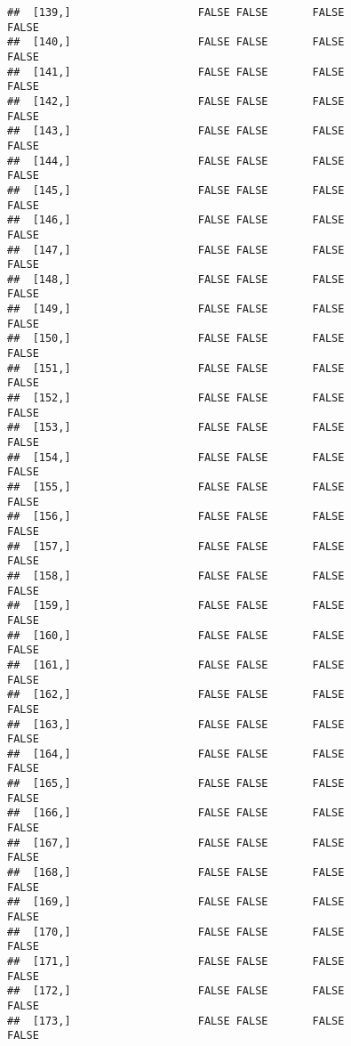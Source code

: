 \documentclass[
]{article}
\begin{document}
\begin{verbatim}
##  [139,]                    FALSE FALSE       FALSE                FALSE
##  [140,]                    FALSE FALSE       FALSE                FALSE
##  [141,]                    FALSE FALSE       FALSE                FALSE
##  [142,]                    FALSE FALSE       FALSE                FALSE
##  [143,]                    FALSE FALSE       FALSE                FALSE
##  [144,]                    FALSE FALSE       FALSE                FALSE
##  [145,]                    FALSE FALSE       FALSE                FALSE
##  [146,]                    FALSE FALSE       FALSE                FALSE
##  [147,]                    FALSE FALSE       FALSE                FALSE
##  [148,]                    FALSE FALSE       FALSE                FALSE
##  [149,]                    FALSE FALSE       FALSE                FALSE
##  [150,]                    FALSE FALSE       FALSE                FALSE
##  [151,]                    FALSE FALSE       FALSE                FALSE
##  [152,]                    FALSE FALSE       FALSE                FALSE
##  [153,]                    FALSE FALSE       FALSE                FALSE
##  [154,]                    FALSE FALSE       FALSE                FALSE
##  [155,]                    FALSE FALSE       FALSE                FALSE
##  [156,]                    FALSE FALSE       FALSE                FALSE
##  [157,]                    FALSE FALSE       FALSE                FALSE
##  [158,]                    FALSE FALSE       FALSE                FALSE
##  [159,]                    FALSE FALSE       FALSE                FALSE
##  [160,]                    FALSE FALSE       FALSE                FALSE
##  [161,]                    FALSE FALSE       FALSE                FALSE
##  [162,]                    FALSE FALSE       FALSE                FALSE
##  [163,]                    FALSE FALSE       FALSE                FALSE
##  [164,]                    FALSE FALSE       FALSE                FALSE
##  [165,]                    FALSE FALSE       FALSE                FALSE
##  [166,]                    FALSE FALSE       FALSE                FALSE
##  [167,]                    FALSE FALSE       FALSE                FALSE
##  [168,]                    FALSE FALSE       FALSE                FALSE
##  [169,]                    FALSE FALSE       FALSE                FALSE
##  [170,]                    FALSE FALSE       FALSE                FALSE
##  [171,]                    FALSE FALSE       FALSE                FALSE
##  [172,]                    FALSE FALSE       FALSE                FALSE
##  [173,]                    FALSE FALSE       FALSE                FALSE

\end{verbatim}
\end{document}
